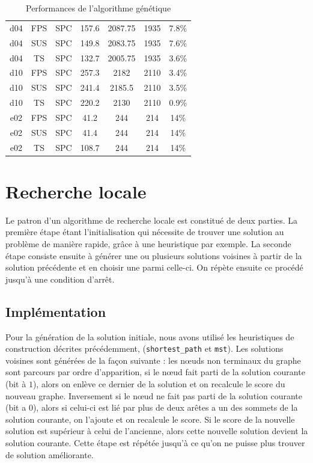 \documentclass[10pt]{article}
\begin{document}
\begin{table}[h!]
\begin{tabular}{|c|c|c|c|c|c|c|}
\hline
d04 & FPS & SPC & 157.6 & 2087.75 & 1935 & 7.8\% \\
d04 & SUS & SPC & 149.8 & 2083.75 & 1935 & 7.6\% \\
\rowcolor{yellow!60} d04 & TS & SPC & 132.7 & 2005.75 & 1935 & 3.6\% \\
\hline
d10 & FPS & SPC & 257.3 & 2182 & 2110 & 3.4\% \\
d10 & SUS & SPC & 241.4 & 2185.5 & 2110 & 3.5\% \\
\rowcolor{yellow!60} d10 & TS & SPC & 220.2 & 2130 & 2110 & 0.9\% \\
\hline
e02 & FPS & SPC & 41.2 & 244 & 214 & 14\% \\
e02 & SUS & SPC & 41.4 & 244 & 214 & 14\% \\
e02 & TS & SPC & 108.7 & 244 & 214 & 14\% \\
\hline
		\end{tabular}
		\caption{Performances de l'algorithme génétique}
		\label{tab-perfgen}
	\end{table}
	
\section{Recherche locale}

Le patron d'un algorithme de recherche locale est constitué de deux parties. La première étape étant l'initialisation qui nécessite de trouver une solution au problème de manière rapide, grâce à une heuristique par exemple. La seconde étape consiste ensuite à générer une ou plusieurs solutions voisines à partir de la solution précédente et en choisir une parmi celle-ci. On répète ensuite ce procédé jusqu'à une condition d'arrêt.

\subsection{Implémentation}
Pour la génération de la solution initiale, nous avons utilisé les heuristiques de construction décrites précédemment, (\texttt{shortest\_path} et \texttt{mst}). Les solutions voisines sont générées de la façon suivante : les nœuds non terminaux du graphe sont parcours par ordre d'apparition, si le nœud fait parti de la solution courante (bit à $1$), alors on enlève ce dernier de la solution et on recalcule le score du nouveau graphe. Inversement si le nœud ne fait pas parti de la solution courante (bit a $0$), alors si celui-ci est lié par plus de deux arêtes a un des sommets de la solution courante, on l'ajoute et on recalcule le score.
    Si le score de la nouvelle solution est supérieur à celui de l'ancienne, alors cette nouvelle solution devient la solution courante. Cette étape est répétée jusqu'à ce qu'on ne puisse plus trouver de solution améliorante.
\end{document}
